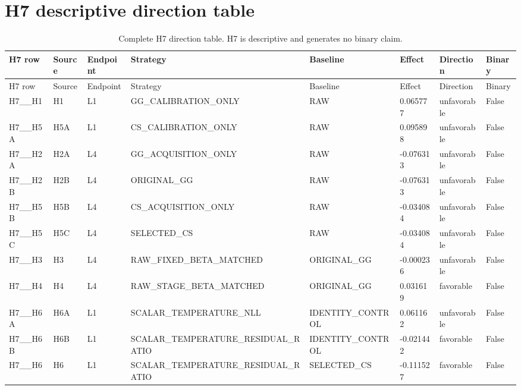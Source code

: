 \documentclass[10pt]{article}
\begin{document}
\section{H7 descriptive direction table}

\begingroup\scriptsize
\begin{longtable}{L{.65in}L{.45in}L{.45in}L{1.25in}L{1.0in}L{.85in}L{.8in}L{.45in}}
\caption{Complete H7 direction table. H7 is descriptive and generates no binary claim.}\\
\toprule
H7 row & Source & Endpoint & Strategy & Baseline & Effect & Direction & Binary\\
\midrule
\endfirsthead
\toprule
H7 row & Source & Endpoint & Strategy & Baseline & Effect & Direction & Binary\\
\midrule
\endhead
H7\_\allowbreak{}\_\allowbreak{}H1 & H1 & L1 & GG\_\allowbreak{}CALIBRATION\_\allowbreak{}ONLY & RAW & 0.065777 & unfavorable & False\\
H7\_\allowbreak{}\_\allowbreak{}H5A & H5A & L1 & CS\_\allowbreak{}CALIBRATION\_\allowbreak{}ONLY & RAW & 0.095898 & unfavorable & False\\
H7\_\allowbreak{}\_\allowbreak{}H2A & H2A & L4 & GG\_\allowbreak{}ACQUISITION\_\allowbreak{}ONLY & RAW & -0.076313 & unfavorable & False\\
H7\_\allowbreak{}\_\allowbreak{}H2B & H2B & L4 & ORIGINAL\_\allowbreak{}GG & RAW & -0.076313 & unfavorable & False\\
H7\_\allowbreak{}\_\allowbreak{}H5B & H5B & L4 & CS\_\allowbreak{}ACQUISITION\_\allowbreak{}ONLY & RAW & -0.034084 & unfavorable & False\\
H7\_\allowbreak{}\_\allowbreak{}H5C & H5C & L4 & SELECTED\_\allowbreak{}CS & RAW & -0.034084 & unfavorable & False\\
H7\_\allowbreak{}\_\allowbreak{}H3 & H3 & L4 & RAW\_\allowbreak{}FIXED\_\allowbreak{}BETA\_\allowbreak{}MATCHED & ORIGINAL\_\allowbreak{}GG & -0.000236 & unfavorable & False\\
H7\_\allowbreak{}\_\allowbreak{}H4 & H4 & L4 & RAW\_\allowbreak{}STAGE\_\allowbreak{}BETA\_\allowbreak{}MATCHED & ORIGINAL\_\allowbreak{}GG & 0.031619 & favorable & False\\
H7\_\allowbreak{}\_\allowbreak{}H6A & H6A & L1 & SCALAR\_\allowbreak{}TEMPERATURE\_\allowbreak{}NLL & IDENTITY\_\allowbreak{}CONTROL & 0.061162 & unfavorable & False\\
H7\_\allowbreak{}\_\allowbreak{}H6B & H6B & L1 & SCALAR\_\allowbreak{}TEMPERATURE\_\allowbreak{}RESIDUAL\_\allowbreak{}RATIO & IDENTITY\_\allowbreak{}CONTROL & -0.021442 & favorable & False\\
H7\_\allowbreak{}\_\allowbreak{}H6 & H6 & L1 & SCALAR\_\allowbreak{}TEMPERATURE\_\allowbreak{}RESIDUAL\_\allowbreak{}RATIO & SELECTED\_\allowbreak{}CS & -0.111527 & favorable & False\\
\bottomrule
\end{longtable}
\endgroup
\end{document}
